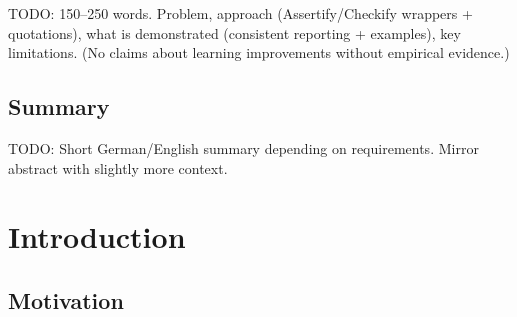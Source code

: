 \documentclass[
	bibliography=totoc,
	listof=totoc,
]{scrbook}
\begin{document}
\begin{marker}\begin{justify}
TODO: 150--250 words. Problem, approach (Assertify/Checkify wrappers + quotations), what is demonstrated (consistent reporting + examples), key limitations.
(No claims about learning improvements without empirical evidence.)
\end{justify}\end{marker}


\section*{Summary} %

\begin{marker}\begin{justify}
TODO: Short German/English summary depending on requirements. Mirror abstract with slightly more context.
\end{justify}\end{marker}


\vfill\pagebreak %
\mainmatter %
\chapter{Introduction} %
\section*{Motivation} %
\end{document}
